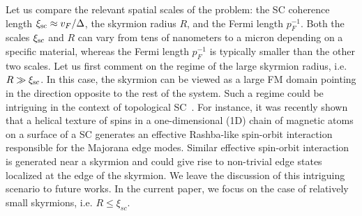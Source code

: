 \documentclass[twocolumn,showpacs,floatfix,longbibliography]{revtex4-1}
\begin{document}
Let us compare the relevant spatial scales of the problem: the SC coherence length $\xi_{\rm sc} \approx v_F/\Delta$, the skyrmion radius $R$, and the Fermi length $p_F^{-1}$. Both the scales $\xi_{\rm sc}$ and $R$ can vary from tens of nanometers to a micron depending on a specific material, whereas the Fermi length $p_F^{-1}$ is typically smaller than the other two scales. Let us first comment on the regime of the large skyrmion radius, i.e. $R\gg \xi_{\rm sc}$. In this case, the skyrmion can be viewed as a large FM domain pointing in the direction opposite to the rest of the system. Such a regime could be intriguing in the context of topological SC~\cite{Alicea2012}. For instance, it was recently shown \cite{Klinovaja2013} that a helical texture of spins in a one-dimensional (1D) chain of magnetic atoms on a surface of a SC generates an effective Rashba-like spin-orbit interaction responsible for the Majorana edge modes. Similar effective spin-orbit interaction is generated near a skyrmion and could give rise to non-trivial edge states localized at the edge of the skyrmion. We leave the discussion of this intriguing scenario to future works. In the current paper, we focus on the case of relatively small skyrmions, i.e. $R\le \xi_{sc}$. 


\end{document}
